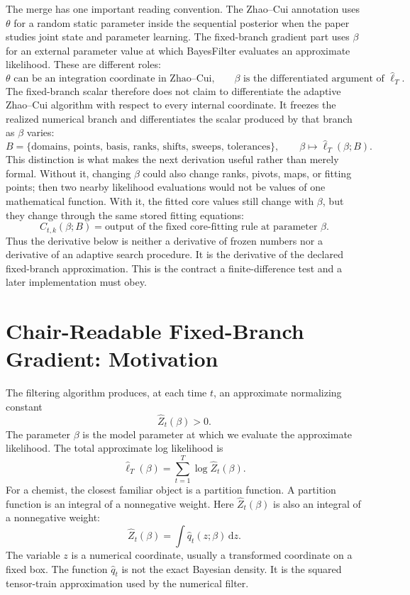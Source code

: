 \documentclass[11pt]{article}
\newcommand{\dd}{\,\mathrm d}
\newcommand{\widehatell}{\widehat\ell}
\begin{document}
The merge has one important reading convention.  The Zhao--Cui annotation uses
\(\theta\) for a random static parameter inside the sequential posterior when
the paper studies joint state and parameter learning.  The fixed-branch
gradient part uses \(\beta\) for an external parameter value at which
BayesFilter evaluates an approximate likelihood.  These are different roles:
\[
    \theta \text{ can be an integration coordinate in Zhao--Cui,}
    \qquad
    \beta \text{ is the differentiated argument of } \widehat\ell_T .
    \tag{P20-B1}
\]
The fixed-branch scalar therefore does not claim to differentiate the adaptive
Zhao--Cui algorithm with respect to every internal coordinate.  It freezes the
realized numerical branch and differentiates the scalar produced by that
branch as \(\beta\) varies:
\[
    B=\{\text{domains, points, basis, ranks, shifts, sweeps, tolerances}\},
    \qquad
    \beta\mapsto \widehat\ell_T(\beta;B).
    \tag{P20-B2}
\]
This distinction is what makes the next derivation useful rather than merely
formal.  Without it, changing \(\beta\) could also change ranks, pivots, maps,
or fitting points; then two nearby likelihood evaluations would not be values
of one mathematical function.  With it, the fitted core values still change
with \(\beta\), but they change through the same stored fitting equations:
\[
    C_{t,k}(\beta;B)
    =
    \text{output of the fixed core-fitting rule at parameter }\beta.
    \tag{P20-B3}
\]
Thus the derivative below is neither a derivative of frozen numbers nor a
derivative of an adaptive search procedure.  It is the derivative of the
declared fixed-branch approximation.  This is the contract a finite-difference
test and a later implementation must obey.

\section{Chair-Readable Fixed-Branch Gradient: Motivation}

The filtering algorithm produces, at each time \(t\), an approximate
normalizing constant
\[
    \widehat Z_t(\beta)>0.
    \tag{P19-1}
\]
The parameter \(\beta\) is the model parameter at which we evaluate the
approximate likelihood.  The total approximate log likelihood is
\[
    \widehatell_T(\beta)
    =
    \sum_{t=1}^{T}\log \widehat Z_t(\beta).
    \tag{P19-2}
\]
For a chemist, the closest familiar object is a partition function.  A
partition function is an integral of a nonnegative weight.  Here
\(\widehat Z_t(\beta)\) is also an integral of a nonnegative weight:
\[
    \widehat Z_t(\beta)
    =
    \int \widehat q_t(z;\beta)\dd z.
    \tag{P19-3}
\]
The variable \(z\) is a numerical coordinate, usually a transformed coordinate
on a fixed box.  The function \(\widehat q_t\) is not the exact Bayesian
density.  It is the squared tensor-train approximation used by the numerical
filter.
\end{document}
